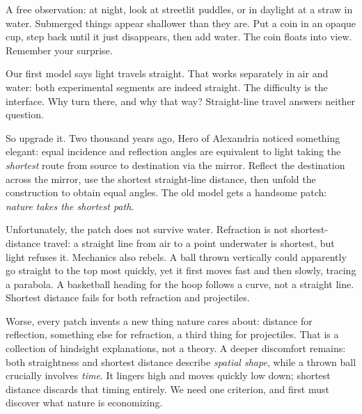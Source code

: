 A free observation: at night, look at streetlit puddles, or in daylight at a straw in water. Submerged things appear shallower than they are. Put a coin in an opaque cup, step back until it just disappears, then add water. The coin floats into view. Remember your surprise.


Our first model says light travels straight. That works separately in air and water: both experimental segments are indeed straight. The difficulty is the interface. Why turn there, and why that way? Straight-line travel answers neither question.

So upgrade it. Two thousand years ago, Hero of Alexandria noticed something elegant: equal incidence and reflection angles are equivalent to light taking the \emph{shortest} route from source to destination via the mirror. Reflect the destination across the mirror, use the shortest straight-line distance, then unfold the construction to obtain equal angles. The old model gets a handsome patch: \emph{nature takes the shortest path}.

Unfortunately, the patch does not survive water. Refraction is not shortest-distance travel: a straight line from air to a point underwater is shortest, but light refuses it. Mechanics also rebels. A ball thrown vertically could apparently go straight to the top most quickly, yet it first moves fast and then slowly, tracing a parabola. A basketball heading for the hoop follows a curve, not a straight line. Shortest distance fails for both refraction and projectiles.

Worse, every patch invents a new thing nature cares about: distance for reflection, something else for refraction, a third thing for projectiles. That is a collection of hindsight explanations, not a theory. A deeper discomfort remains: both straightness and shortest distance describe \emph{spatial shape}, while a thrown ball crucially involves \emph{time}. It lingers high and moves quickly low down; shortest distance discards that timing entirely. We need one criterion, and first must discover what nature is economizing.


